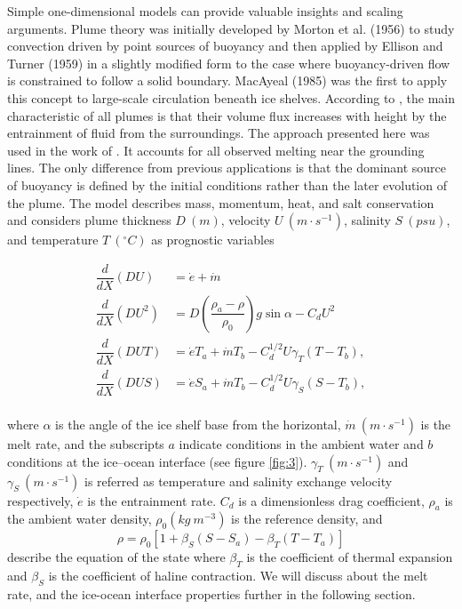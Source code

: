 \documentclass[11pt,a4paper]{article}
\begin{document}
	Simple one-dimensional models can provide valuable insights and scaling arguments. Plume theory was initially developed by Morton et al. (1956) to study convection driven by point sources of buoyancy and then applied by Ellison and Turner (1959) in a slightly modified form to the case where buoyancy-driven flow is constrained to follow a solid boundary. MacAyeal (1985) was the first to apply this concept to large-scale circulation beneath ice shelves. According to \cite{jenkins2011convection}, the main characteristic of all plumes is that their volume flux increases with height by the entrainment of fluid from the surroundings. The approach presented here was used in the work of \citep{jenkins2011convection}. It accounts for all observed melting near the grounding lines. The only difference from previous applications is that the dominant source of buoyancy is defined by the initial conditions rather than the later evolution of the plume. The model describes mass, momentum, heat, and salt conservation and considers plume thickness $D\ (m)$, velocity $U\ (m\cdot s^{-1})$, salinity $S\ (psu)$, and temperature $T\ (^{\circ} C)$ as prognostic variables
	
	\begin{align*}
	    \dfrac{d}{dX}(DU)& = \dot{e} + \dot{m}\\
	    \dfrac{d}{dX}(DU^2)& = D\left(\dfrac{\rho_a-\rho}{\rho_0}\right)g\sin\alpha - C_dU^2\\
	    \dfrac{d}{dX}(DUT)& = \dot{e}T_a + \dot{m}T_b - C_d^{1/2}U\gamma_T(T-T_b),\\
	    \dfrac{d}{dX}(DUS)& = \dot{e}S_a + \dot{m}T_b - C_d^{1/2}U\gamma_S(S-T_b),\\
	\end{align*}
	
	\noindent where $\alpha$ is the angle of the ice shelf base from the horizontal, $\dot{m}\ (m\cdot s^{-1})$ is the melt rate, and the subscripts $a$ indicate conditions in the ambient water and $b$ conditions at the ice–ocean interface (see figure \ref{fig:3}). $\gamma_T\ (m\cdot s^{-1})$ and $\gamma_S\ (m\cdot s^{-1})$ is referred as temperature and salinity exchange velocity respectively, $\dot{e}$ is the entrainment rate. $C_d$ is a dimensionless drag coefficient, $\rho_a$ is the ambient water density, $\rho_0(kg\ m^{-3})$ is the reference density, and 
	$$\rho = \rho_0\left[1+\beta_S(S-S_a)-\beta_T(T-T_a)\right]$$ describe the equation of the state where $\beta_T$ is the coefficient of thermal expansion and $\beta_S$ is the coefficient of haline contraction. We will discuss about the melt rate, and the ice-ocean interface properties further in the following section.
	
\end{document}
